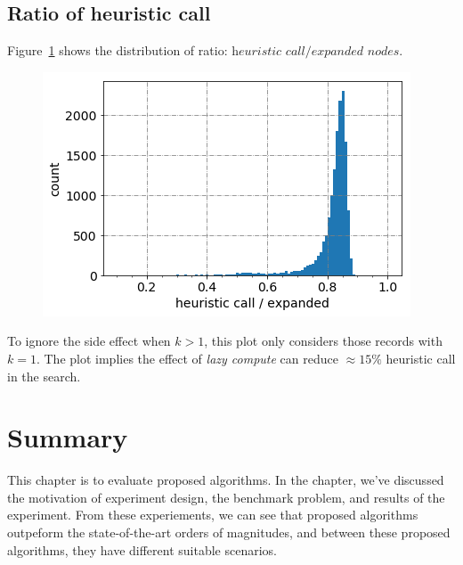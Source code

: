 \subsection{Ratio of heuristic call}
Figure~\ref{lazy_compute} shows the distribution of ratio:
$\textit{heuristic call} / \textit{expanded nodes}$.
\begin{figure}[htp]
  \centering
  \includegraphics[width=.7\linewidth]{./pic/lazy_compute.png}
  \caption{}
  \label{lazy_compute}
\end{figure}
To ignore the side effect when $k>1$, this plot only considers those records with $k=1$.
The plot implies the effect of \textit{lazy compute} can reduce $\approx 15\%$ heuristic call in
the search.

\section{Summary}
This chapter is to evaluate proposed algorithms.
In the chapter, we've discussed the motivation of experiment design,
the benchmark problem, and results of the experiment.
From these experiements, we can see that proposed algorithms outpeform the state-of-the-art
orders of magnitudes, and between these proposed algorithms, they have different suitable
scenarios.
